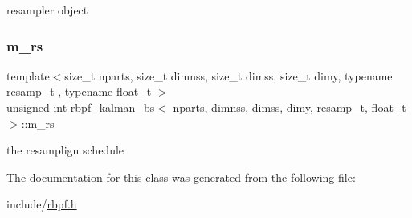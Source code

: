 resampler object \mbox{\label{classrbpf__kalman__bs_a0d8b3393bb7cb301a6719e56d2c646a9}} 
\subsubsection{\texorpdfstring{m\+\_\+rs}{m\_rs}}
{\footnotesize\ttfamily template$<$size\+\_\+t nparts, size\+\_\+t dimnss, size\+\_\+t dimss, size\+\_\+t dimy, typename resamp\+\_\+t , typename float\+\_\+t $>$ \\
unsigned int \hyperlink{classrbpf__kalman__bs}{rbpf\+\_\+kalman\+\_\+bs}$<$ nparts, dimnss, dimss, dimy, resamp\+\_\+t, float\+\_\+t $>$\+::m\+\_\+rs\hspace{0.3cm}{\ttfamily [private]}}

the resamplign schedule 

The documentation for this class was generated from the following file\+:\begin{DoxyCompactItemize}
\item 
include/\hyperlink{rbpf_8h}{rbpf.\+h}\end{DoxyCompactItemize}
